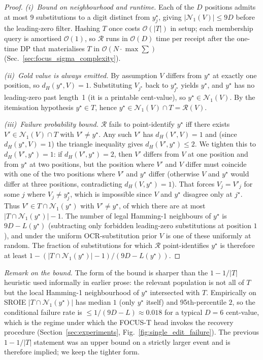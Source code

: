 \begin{proof}
\textit{(i)~Bound on neighbourhood and runtime.}
Each of the $D$ positions admits at most $9$ substitutions to a digit
distinct from $y^\star_j$, giving $|\mathcal{N}_1(V)|\le 9D$ before
the leading-zero filter.  Hashing $T$ once costs $\mathcal{O}(|T|)$
in setup; each membership query is amortised $\mathcal{O}(1)$, so
$\mathcal{R}$ runs in $\mathcal{O}(D)$ time per receipt after the
one-time DP that materialises $T$ in
$\mathcal{O}(N\cdot\max\sum)$ (Sec.~\ref{sec:focus_sigma_complexity}).
\smallskip

\textit{(ii)~Gold value is always emitted.}
By assumption $V$ differs from $y^\star$ at exactly one position, so
$d_H(y^\star, V)=1$.  Substituting $V_{j^\star}$ back to
$y^\star_{j^\star}$ yields $y^\star$, and $y^\star$ has no
leading-zero past length~1 (it is a printable cent-value), so
$y^\star\in\mathcal{N}_1(V)$.  By the itemisation hypothesis
$y^\star\in T$, hence $y^\star \in \mathcal{N}_1(V)\cap T = \mathcal R(V)$.
\smallskip

\textit{(iii)~Failure probability bound.}
$\mathcal{R}$ fails to point-identify $y^\star$ iff there exists
$V'\in\mathcal{N}_1(V)\cap T$ with $V'\neq y^\star$.  Any such $V'$
has $d_H(V',V)=1$ and (since $d_H(y^\star,V)=1$) the triangle
inequality gives $d_H(V',y^\star)\le 2$.  We tighten this to
$d_H(V',y^\star)=1$: if $d_H(V',y^\star)=2$, then $V'$ differs from
$V$ at one position and from $y^\star$ at two positions, but the
position where $V'$ and $V$ differ must coincide with one of the two
positions where $V'$ and $y^\star$ differ (otherwise $V$ and $y^\star$
would differ at three positions, contradicting $d_H(V,y^\star)=1$).
That forces $V_j = V'_j$ for some $j$ where $V_j\neq y^\star_j$,
which is impossible since $V$ and $y^\star$ disagree only at
$j^\star$.  Thus $V'\in T\cap \mathcal{N}_1(y^\star)$ with
$V'\neq y^\star$, of which there are at most
$|T\cap\mathcal{N}_1(y^\star)|-1$.
The number of legal Hamming-1 neighbours of $y^\star$ is
$9D - L(y^\star)$ (subtracting only forbidden leading-zero
substitutions at position $1$), and under the uniform OCR-substitution
prior $V$ is one of these uniformly at random.  The fraction of
substitutions for which $\mathcal R$ point-identifies $y^\star$ is
therefore at least $1 - (|T\cap\mathcal{N}_1(y^\star)|-1)/(9D-L(y^\star))$.
\qedhere
\end{proof}

\noindent
\emph{Remark on the bound.}  The form of the bound is sharper than
the $1 - 1/|T|$ heuristic used informally in earlier prose: the
relevant population is not all of $T$ but the local Hamming-1
neighbourhood of $y^\star$ intersected with $T$.  Empirically on
SROIE $|T\cap\mathcal{N}_1(y^\star)|$ has median $1$ (only $y^\star$
itself) and 95th-percentile $2$, so the conditional failure rate is
$\le 1/(9D-L)\approx 0.018$ for a typical $D=6$ cent-value, which is
the regime under which the FOCUS-T head invokes the recovery
procedure (Section~\ref{sec:experiments},
Fig.~\ref{fig:single_edit_failure}).  The previous $1-1/|T|$ statement
was an upper bound on a strictly larger event and is therefore
implied; we keep the tighter form.

